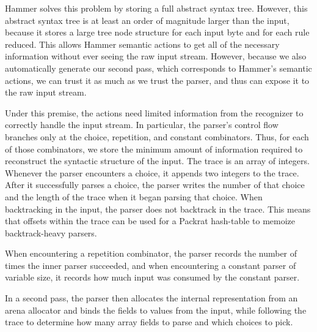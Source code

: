 Hammer solves this problem by storing a full abstract syntax tree. However, this
abstract syntax tree is at least an order of magnitude larger than the input,
because it stores a large tree node structure for each input byte and for each
rule reduced. This allows Hammer semantic actions to get all of the necessary
information without ever seeing the raw input stream. However, because we also
automatically generate our second pass, which corresponds to Hammer's semantic
actions, we can trust it as much as we trust the parser, and thus can expose it
to the raw input stream.

Under this premise, the actions need limited information from the
recognizer to correctly handle the input stream. In particular, the parser's
control flow branches only at the choice, repetition, and constant combinators.
Thus, for each of those combinators, we store the minimum amount of information
required to reconstruct the syntactic structure of the input. The trace is an
array of integers.
Whenever the parser encounters a choice, it appends two integers to the trace. After it
successfully parses a choice, the parser writes the number of that choice and
the length of the trace when it began parsing that choice. When backtracking in
the input, the parser does not backtrack in the trace. This means that offsets
within the trace can be used for a Packrat hash-table to memoize backtrack-heavy
parsers.

When encountering a repetition combinator, the parser records the number of
times the inner parser succeeded, and when encountering a constant parser of
variable size, it records how much input was consumed by the constant parser. 

In a second pass, the parser then allocates the internal representation from an
arena allocator and binds the fields to values from the input, while following
the trace to determine how many array fields to parse and which choices to pick.



